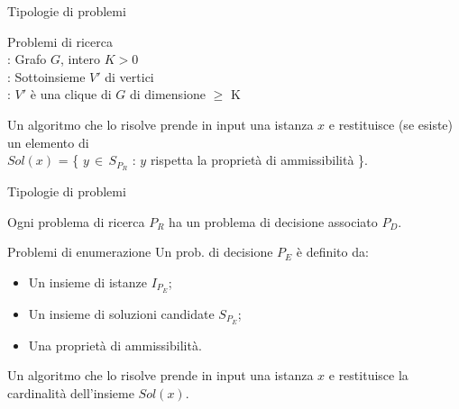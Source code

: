 \documentclass[10pt,a4paper]{article}
\begin{document}
\begin{multicols}{3}
\begin{textbox}{Tipologie di problemi}
\begin{textbox}{Problemi di ricerca}
\\
: Grafo \(G\), intero \(K > 0\) \\
: Sottoinsieme \(V'\) di vertici \\
: \(V'\) è una clique di \(G\) di dimensione \(\geq\) K

Un algoritmo che lo risolve prende in input una
istanza \(x\) e restituisce (se esiste) un elemento di\\
\(Sol(x)\) = \{ \(y\,\in\,S_{P_R}\) : \(y\) rispetta la proprietà di ammissibilità \}.

\end{textbox}

\end{textbox}

\begin{textbox}{Tipologie di problemi}

Ogni problema di ricerca \(P_R\) ha un problema di decisione associato \(P_D\).\\

\begin{textbox}{Problemi di enumerazione}
Un prob. di decisione \(P_E\) è definito da:
\begin{itemize}[leftmargin=*]
    \item Un insieme di istanze \(I_{P_E}\);
    \item Un insieme di soluzioni candidate  \(S_{P_E}\);
    \item Una proprietà di ammissibilità.
\end{itemize}
Un algoritmo che lo risolve prende in input una istanza \(x\)  e
restituisce la cardinalità dell’insieme \(Sol(x)\).
\end{textbox}


\end{textbox}
\end{multicols}
\end{document}
